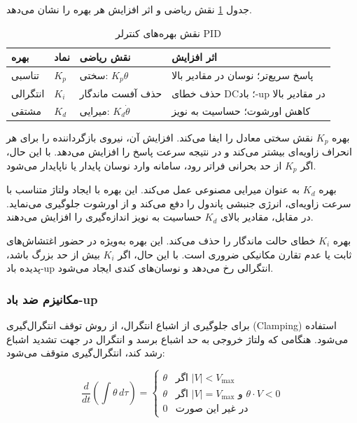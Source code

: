 جدول \ref{tab:pid-gains} نقش ریاضی و اثر افزایش هر بهره را نشان می‌دهد.

\begin{table}[H]
\centering
\caption{نقش بهره‌های کنترلر PID}
\label{tab:pid-gains}
\begin{tabular}{@{}llll@{}}
\toprule
بهره & نماد & نقش ریاضی & اثر افزایش \\
\midrule
تناسبی & $K_p$ & سختی: $K_p\theta$ & پاسخ سریع‌تر؛ نوسان در مقادیر بالا \\
انتگرالی & $K_i$ & حذف آفست ماندگار & حذف خطای DC؛ باد-up در مقادیر بالا \\
مشتقی & $K_d$ & میرایی: $K_d\dot{\theta}$ & کاهش اورشوت؛ حساسیت به نویز \\
\bottomrule
\end{tabular}
\end{table}

بهره $K_p$ نقش سختی معادل را ایفا می‌کند. افزایش آن، نیروی بازگرداننده را برای هر انحراف زاویه‌ای بیشتر می‌کند و در نتیجه سرعت پاسخ را افزایش می‌دهد. با این حال، اگر $K_p$ از حد بحرانی فراتر رود، سامانه وارد نوسان پایدار یا ناپایدار می‌شود.

بهره $K_d$ به عنوان میرایی مصنوعی عمل می‌کند. این بهره با ایجاد ولتاژ متناسب با سرعت زاویه‌ای، انرژی جنبشی پاندول را دفع می‌کند و از اورشوت جلوگیری می‌نماید. در مقابل، مقادیر بالای $K_d$ حساسیت به نویز اندازه‌گیری را افزایش می‌دهند.

بهره $K_i$ خطای حالت ماندگار را حذف می‌کند. این بهره به‌ویژه در حضور اغتشاش‌های ثابت یا عدم تقارن مکانیکی ضروری است. با این حال، اگر $K_i$ بیش از حد بزرگ باشد، پدیده باد-up انتگرالی رخ می‌دهد و نوسان‌های کندی ایجاد می‌شود.

\subsubsection{مکانیزم ضد باد-up}

برای جلوگیری از اشباع انتگرال، از روش توقف انتگرال‌گیری (Clamping) استفاده می‌شود. هنگامی که ولتاژ خروجی به حد اشباع برسد و انتگرال در جهت تشدید اشباع رشد کند، انتگرال‌گیری متوقف می‌شود:

\begin{equation}
\frac{d}{dt}\!\left(\int\theta\,d\tau\right) = \begin{cases} \theta & \text{اگر } |V| < V_{\max} \\ \theta & \text{اگر } |V| = V_{\max} \text{ و } \theta \cdot V < 0 \\ 0 & \text{در غیر این صورت} \end{cases}
\end{equation}

